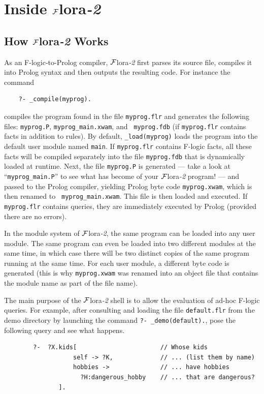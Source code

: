 \documentclass[11pt]{article}
\newcommand{\FLORA}{{\mbox{\sc ${\cal F}${lora}\rm\emph{-2}}}\xspace}
\newcommand{\fl}{\mbox{F-logic}\xspace}
\newcommand{\ofile}{xwam}
\begin{document}
\newpage
\section{Inside \FLORA}

\subsection{How \FLORA Works}


As an \fl-to-Prolog compiler, \FLORA first parses its source file,
compiles it into Prolog syntax and then outputs the resulting code. For
instance the command 
\begin{verbatim}
    ?- _compile(myprog).
\end{verbatim}
compiles the program found in the file {\tt myprog.flr} and generates the
following files: {\tt myprog.P}, {\tt myprog\_main.\ofile}, and {\tt
  myprog.fdb} (if {\tt myprog.flr} contains facts in addition to rules).
By default, {\tt \_load(myprog)} loads the program into the default user
module named {\tt main}. If {\tt myprog.flr} contains \fl facts, all these
facts will be compiled separately into the file {\tt myprog.fdb} that is
dynamically loaded at runtime.  Next, the file {\tt myprog.P} is generated
--- take a look at ``{\tt myprog\_main.P}'' to see what has become of your
\FLORA program! --- and passed to the Prolog compiler, yielding Prolog byte
code {\tt myprog.\ofile}, which is then renamed to {\tt
  myprog\_main.\ofile}. This file is then loaded and executed.  If {\tt
  myprog.flr} contains queries, they are immediately executed by Prolog
(provided there are no errors).

In the module system of \FLORA, the same program can be loaded into any
user module. The same program can even be loaded into two different
modules at the same time, in which case there will be two distinct copies
of the same program running at the same time. For each user module, a different
byte code is generated (this is why {\tt myprog.\ofile} was renamed into an
object file that contains the module name as part of the file name).

The main purpose of the \FLORA shell is to allow the evaluation
of ad-hoc \fl queries. For example, after consulting and loading the
file \texttt{default.flr} from the demo directory by launching
the command \texttt{?-~\_demo(default).}, pose the following query
and see what happens.
\begin{verbatim}
        ?-  ?X.kids[                       // Whose kids
                   self -> ?K,             // ... (list them by name)
                   hobbies ->              // ... have hobbies
                     ?H:dangerous_hobby    // ... that are dangerous?
               ]. 
\end{verbatim}
\end{document}

